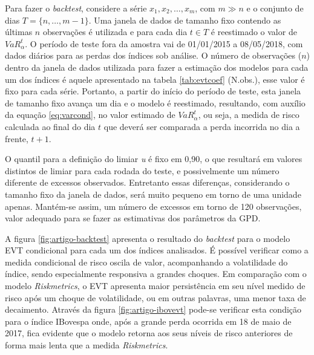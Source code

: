 \documentclass[1p]{elsarticle}
\theoremstyle{definition}
\begin{document}
Para fazer o \emph{backtest}, considere a série $x_1, x_2, \ldots, x_m$, com $m\gg n$ e o conjunto de dias $T = \{n, \ldots, m-1\}$. Uma janela de dados de tamanho fixo contendo as últimas $n$ observações é utilizada e para cada dia $t \in T$ é reestimado o valor de $VaR^t_\alpha$. O período de teste fora da amostra vai de 01/01/2015 a 08/05/2018, com dados diários para as perdas dos índices sob análise. O número de observações ($n$) dentro da janela de dados utilizada para fazer a estimação dos modelos para cada um dos índices é aquele apresentado na tabela \ref{tab:evtcoef} (N.obs.), esse valor é fixo para cada série. Portanto, a partir do início do período de teste, esta janela de tamanho fixo avança um dia e o modelo é reestimado, resultando, com auxílio da equação \eqref{eq:varcond}, no valor estimado de $VaR_\alpha^t$, ou seja, a medida de risco calculada ao final do dia $t$ que deverá ser comparada a perda incorrida no dia a frente, $t+1$.

O quantil para a definição do limiar \emph{u} é fixo em 0,90, o que resultará em valores distintos de limiar para cada rodada do teste, e possivelmente um número diferente de excessos observados. Entretanto essas diferenças, considerando o tamanho fixo da janela de dados, será muito pequeno em torno de uma unidade apenas. Mantém-se assim, um número de excessos em torno de 120 observações, valor adequado para se fazer as estimativas dos parâmetros da GPD. 

A figura \ref{fig:artigo-backtest} apresenta o resultado do \emph{backtest} para o modelo EVT condicional para cada um dos índices analisados. É possível verificar como a medida condicional de risco oscila de valor, acompanhando a volatilidade do índice, sendo especialmente responsiva a grandes choques. Em comparação com o modelo \emph{Riskmetrics}, o EVT apresenta maior persistência em seu nível medido de risco após um choque de volatilidade, ou em outras palavras, uma menor taxa de decaimento. Através da figura \ref{fig:artigo-ibovevt} pode-se verificar esta condição para o índice IBovespa onde, após a grande perda ocorrida em 18 de maio de 2017, fica evidente que o modelo retorna aos seus níveis de risco anteriores de forma mais lenta que a medida \emph{Riskmetrics}.%
\end{document}
